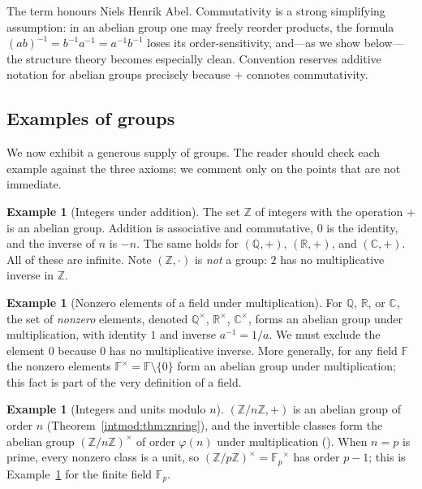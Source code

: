 \documentclass[11pt,a4paper]{article}
\theoremstyle{definition}
\newtheorem{example}[theorem]{Example}
\theoremstyle{remark}
\newcommand{\Z}{\ensuremath{\mathbb{Z}}}
\newcommand{\Q}{\ensuremath{\mathbb{Q}}}
\newcommand{\R}{\ensuremath{\mathbb{R}}}
\providecommand{\C}{}\renewcommand{\C}{\ensuremath{\mathbb{C}}}
\newcommand{\F}{\ensuremath{\mathbb{F}}}
\newcommand{\Fp}{\ensuremath{\mathbb{F}_{p}}}
\begin{document}
The term honours Niels Henrik Abel. Commutativity is a strong simplifying assumption: in an abelian group one may freely reorder products, the formula \((ab)^{-1} = b^{-1}a^{-1} = a^{-1}b^{-1}\) loses its order-sensitivity, and---as we show below---the structure theory becomes especially clean. Convention reserves additive notation for abelian groups precisely because \(+\) connotes commutativity.

\subsection{Examples of groups}

We now exhibit a generous supply of groups. The reader should check each example against the three axioms; we comment only on the points that are not immediate.

\begin{example}[Integers under addition]\label{groups:exa-Z}
The set \(\Z\) of integers with the operation \(+\) is an abelian group. Addition is associative and commutative, \(0\) is the identity, and the inverse of \(n\) is \(-n\). The same holds for \((\Q,+)\), \((\R,+)\), and \((\C,+)\). All of these are infinite. Note \((\Z, \cdot)\) is \emph{not} a group: \(2\) has no multiplicative inverse in \(\Z\).
\end{example}

\begin{example}[Nonzero elements of a field under multiplication]\label{groups:exa-field-mult}
For \(\Q\), \(\R\), or \(\C\), the set of \emph{nonzero} elements, denoted \(\Q^\times\), \(\R^\times\), \(\C^\times\), forms an abelian group under multiplication, with identity \(1\) and inverse \(a^{-1} = 1/a\). We must exclude the element \(0\) because \(0\) has no multiplicative inverse. More generally, for any field \(\F\) the nonzero elements \(\F^\times = \F \setminus \{0\}\) form an abelian group under multiplication; this fact is part of the very definition of a field.
\end{example}

\begin{example}[Integers and units modulo \(n\)]\label{groups:exa-Zn}
\((\Z/n\Z, +)\) is an abelian group of order \(n\) (Theorem~\ref{intmod:thm:znring}), and the invertible classes form the abelian group \((\Z/n\Z)^\times\) of order \(\varphi(n)\) under multiplication (). When \(n = p\) is prime, every nonzero class is a unit, so \((\Z/p\Z)^\times = \Fp^\times\) has order \(p-1\); this is Example~\ref{groups:exa-field-mult} for the finite field \(\Fp\).
\end{example}
\end{document}
